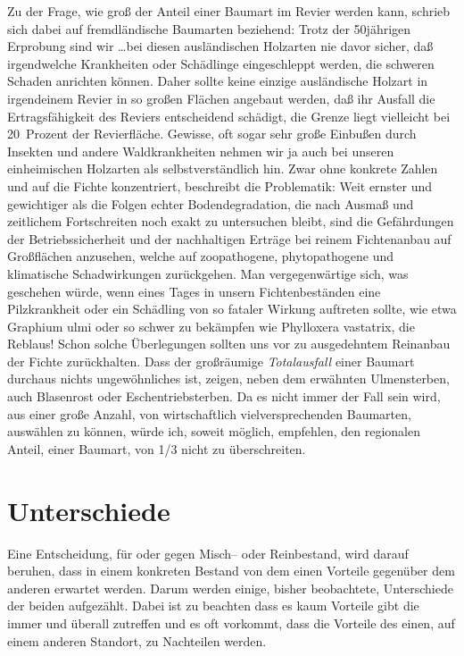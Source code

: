 \documentclass[twocolumn]{scrartcl}
\begin{document}
Zu der Frage, wie groß der Anteil einer Baumart im Revier werden kann,
schrieb \cite[S.~233]{wiedemann1951Ertragskunde} sich dabei auf
fremdländische Baumarten beziehend: \frqq Trotz der 50jährigen
Erprobung sind wir \dots bei diesen ausländischen Holzarten nie davor
sicher, daß irgendwelche Krankheiten oder Schädlinge eingeschleppt
werden, die schweren Schaden anrichten können. Daher sollte keine
einzige ausländische Holzart in irgendeinem Revier in so großen
Flächen angebaut werden, daß ihr Ausfall die Ertragsfähigkeit des
Reviers entscheidend schädigt, die Grenze liegt vielleicht bei
20~Prozent der Revierfläche. Gewisse, oft sogar sehr große Einbußen
durch Insekten und andere Waldkrankheiten nehmen wir ja auch bei
unseren einheimischen Holzarten als selbstverständlich hin.\flqq{}
Zwar ohne konkrete Zahlen und auf die Fichte konzentriert, beschreibt
\cite[S.~394]{assmann1961Waldertraskunde} die Problematik: \frqq Weit
ernster und gewichtiger als die Folgen echter Bodendegradation, die
nach Ausmaß und zeitlichem Fortschreiten noch exakt zu untersuchen
bleibt, sind die Gefährdungen der Betriebssicherheit und der
nachhaltigen Erträge bei reinem Fichtenanbau auf Großflächen
anzusehen, welche auf zoopathogene, phytopathogene und klimatische
Schadwirkungen zurückgehen. Man vergegenwärtige sich, was geschehen
würde, wenn eines Tages in unsern Fichtenbeständen eine Pilzkrankheit
oder ein Schädling von so fataler Wirkung auftreten sollte, wie etwa
Graphium ulmi oder so schwer zu bekämpfen wie Phylloxera vastatrix,
die Reblaus! Schon solche Überlegungen sollten uns vor zu ausgedehntem
Reinanbau der Fichte zurückhalten.\flqq{} Dass der großräumige
\emph{Totalausfall} einer Baumart durchaus nichts ungewöhnliches ist,
zeigen, neben dem erwähnten Ulmensterben, auch Blasenrost oder
Eschentriebsterben. Da es nicht immer der Fall sein wird, aus einer
große Anzahl, von wirtschaftlich vielversprechenden Baumarten,
auswählen zu können, würde ich, soweit möglich, empfehlen, den
regionalen Anteil, einer Baumart, von 1/3 nicht zu überschreiten.

\section{Unterschiede}
\label{sec:unterschiede}

Eine Entscheidung, für oder gegen Misch-- oder Reinbestand, wird
darauf beruhen, dass in einem konkreten Bestand von dem einen Vorteile
gegenüber dem anderen erwartet werden. Darum werden einige, bisher
beobachtete, Unterschiede der beiden aufgezählt. Dabei ist zu beachten
dass es kaum Vorteile gibt die immer und überall zutreffen und es oft
vorkommt, dass die Vorteile des einen, auf einem anderen Standort, zu
Nachteilen werden.
\end{document}
